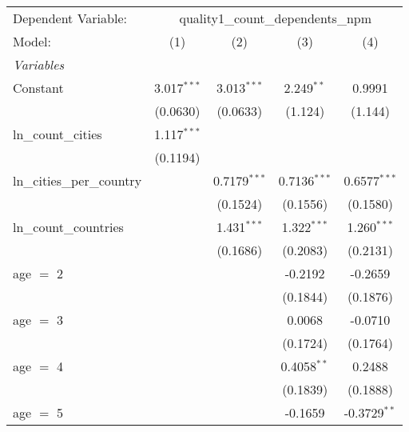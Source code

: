 
\begingroup
\centering
\begin{tabular}{lcccc}
   \tabularnewline \midrule \midrule
   Dependent Variable: & \multicolumn{4}{c}{quality1\_count\_dependents\_npm}\\
   Model:                               & (1)           & (2)            & (3)            & (4)\\  
   \midrule
   \emph{Variables}\\
   Constant                             & 3.017$^{***}$ & 3.013$^{***}$  & 2.249$^{**}$   & 0.9991\\   
                                        & (0.0630)      & (0.0633)       & (1.124)        & (1.144)\\   
   ln\_count\_cities                    & 1.117$^{***}$ &                &                &   \\   
                                        & (0.1194)      &                &                &   \\   
   ln\_cities\_per\_country             &               & 0.7179$^{***}$ & 0.7136$^{***}$ & 0.6577$^{***}$\\   
                                        &               & (0.1524)       & (0.1556)       & (0.1580)\\   
   ln\_count\_countries                 &               & 1.431$^{***}$  & 1.322$^{***}$  & 1.260$^{***}$\\   
                                        &               & (0.1686)       & (0.2083)       & (0.2131)\\   
   age $=$ 2                            &               &                & -0.2192        & -0.2659\\   
                                        &               &                & (0.1844)       & (0.1876)\\   
   age $=$ 3                            &               &                & 0.0068         & -0.0710\\   
                                        &               &                & (0.1724)       & (0.1764)\\   
   age $=$ 4                            &               &                & 0.4058$^{**}$  & 0.2488\\   
                                        &               &                & (0.1839)       & (0.1888)\\   
   age $=$ 5                            &               &                & -0.1659        & -0.3729$^{**}$\\   

\end{tabular}
